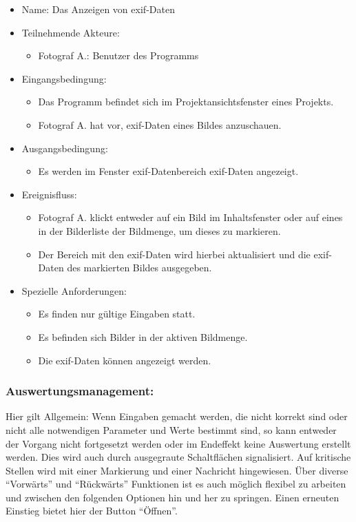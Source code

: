 	\begin{itemize}
		\item Name: Das Anzeigen von \gls{exif}-Daten
		\item Teilnehmende Akteure:
		\begin{itemize}
			\item	Fotograf A.: Benutzer des Programms		
		\end{itemize}
		\item Eingangsbedingung:
		\begin{itemize}
			\item	Das Programm befindet sich im Projektansichtsfenster eines Projekts.
			\item Fotograf A. hat vor, \gls{exif}-Daten eines Bildes anzuschauen.
		\end{itemize}
		\item Ausgangsbedingung:
		\begin{itemize}
			\item	Es werden im Fenster \gls{exif}-Datenbereich \gls{exif}-Daten angezeigt.	
		\end{itemize}
		\item Ereignisfluss:
		\begin{itemize}
			\item Fotograf A. klickt entweder auf ein Bild im Inhaltsfenster oder auf eines in der Bilderliste der Bildmenge, um dieses zu markieren.
			\item Der Bereich mit den \gls{exif}-Daten wird hierbei aktualisiert und die \gls{exif}-Daten des markierten Bildes ausgegeben.
		\end{itemize}
		\item Spezielle Anforderungen:
		\begin{itemize}
			\item	Es finden nur gültige Eingaben statt.
			\item Es befinden sich Bilder in der aktiven Bildmenge.
			\item Die \gls{exif}-Daten können angezeigt werden.			
		\end{itemize}			
	\end{itemize}
		
	\subsubsection{Auswertungsmanagement:}
Hier gilt Allgemein: Wenn Eingaben gemacht werden, die nicht korrekt sind oder nicht alle notwendigen Parameter und Werte bestimmt sind, so kann entweder der Vorgang nicht fortgesetzt werden oder im Endeffekt keine Auswertung erstellt werden. Dies wird auch durch ausgegraute Schaltflächen signalisiert. Auf kritische Stellen wird mit einer Markierung und einer Nachricht hingewiesen. Über diverse "`Vorwärts"' und "`Rückwärts"' Funktionen ist es auch möglich flexibel zu arbeiten und zwischen den folgenden Optionen hin und her zu springen. Einen erneuten Einstieg bietet hier der Button "`Öffnen"'.
 
